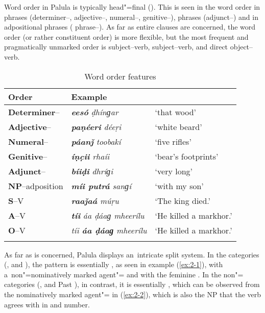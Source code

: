 Word order in Palula is typically head"=final (). This is seen in the word order in  phrases (determiner--, adjective--, numeral--, gen\-i\-tive--),  phrases (adjunct--) and in adpositional phrases ( phrase--). As far as entire clauses are concerned, the word order (or rather constituent order) is more flexible, but the most frequent and pragmatically unmarked order is  subject--verb,  subject--verb, and direct object--verb.


\begin{table}[ht]
\caption{Word order features}
\begin{tabularx}{\textwidth}{ l l Q }
\lsptoprule
Order &
Example\\\midrule
\textbf{Determiner}-- &
\textit{\textbf{eesó} ḍhínɡar} &
`that wood' \\
\textbf{Adjective}-- &
\textit{\textbf{paṇéeri} déeṛi} &
`white beard' \\
\textbf{Numeral}-- &
\textit{\textbf{páanǰ} toobakí} &
`five rifles'\\
\textbf{Genitive}-- &
\textit{\textbf{íṇc̣ii} rhaíi} &
`bear's footprints'\\
\textbf{Adjunct}-- &
\textit{\textbf{bíiḍi} dhríɡi} &
`very long'\\
\textbf{NP}--adposition &
\textit{\textbf{míi putrá} sanɡí} &
`with my son'\\
\textbf{S}--V &
\textit{\textbf{raaǰaá} múṛu} &
`The king died.'\\
\textbf{A}--V &
\textit{\textbf{tíi} áa ḍáaɡ mheerílu} &
`He killed a markhor.' \\
\textbf{O}--V &
\textit{tíi \textbf{áa ḍáaɡ} mheerílu} &
`He killed a markhor.' 
\\\lspbottomrule
\end{tabularx}
\label{tab:2-worder}
\end{table}


As far as  is concerned, Palula displays an~intricate split system. In the  categories (,  and ), the pattern is essentially , as seen in example (\ref{ex:2-1}), with a~non"=nominatively marked agent"= and  with the feminine . In the non"= categories (,  and Past ), in contrast, it is essentially , which can be observed from the nominatively marked agent"= in (\ref{ex:2-2}), which is also the NP that the  verb agrees with in  and number.

